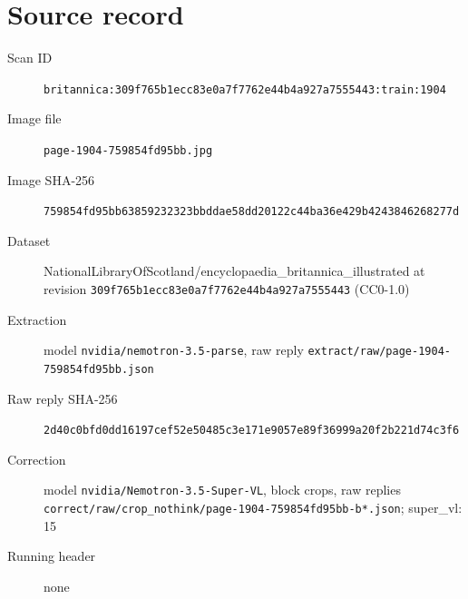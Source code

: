 \documentclass{article}
\begin{document}
\section*{Source record}
\begin{description}
\item[Scan ID] \texttt{britannica:309f765b1ecc83e0a7f7762e44b4a927a7555443:train:1904}
\item[Image file] \texttt{page-1904-759854fd95bb.jpg}
\item[Image SHA-256] \texttt{759854fd95bb63859232323bbddae58dd20122c44ba36e429b4243846268277d}
\item[Dataset] NationalLibraryOfScotland/encyclopaedia\_britannica\_illustrated at revision \texttt{309f765b1ecc83e0a7f7762e44b4a927a7555443} (CC0-1.0)
\item[Extraction] model \texttt{nvidia/nemotron-3.5-parse}, raw reply \texttt{extract/raw/page-1904-759854fd95bb.json}
\item[Raw reply SHA-256] \texttt{2d40c0bfd0dd16197cef52e50485c3e171e9057e89f36999a20f2b221d74c3f6}
\item[Correction] model \texttt{nvidia/Nemotron-3.5-Super-VL}, block crops, raw replies \texttt{correct/raw/crop\_nothink/page-1904-759854fd95bb-b*.json}; super\_vl: 15
\item[Running header] none
\end{description}
\end{document}
